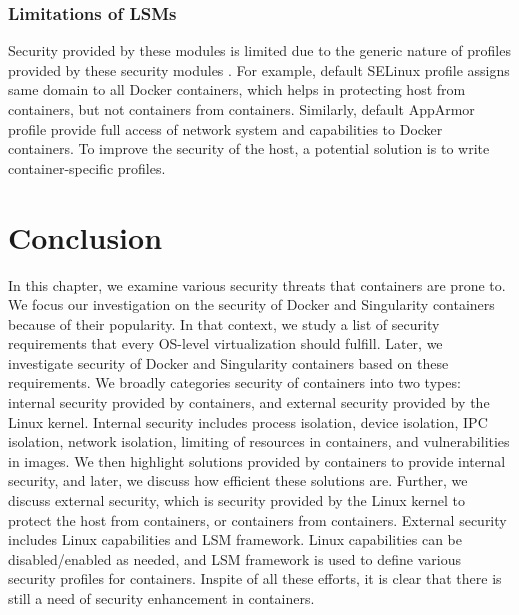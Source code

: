 \subsubsection{Limitations of LSMs}

Security provided by these modules is limited due to
the generic nature of profiles provided by these security
modules \cite{martin2018docker}. For example, default
SELinux profile assigns same domain to all Docker
containers, which helps in protecting host from containers,
but not containers from containers. Similarly, default
AppArmor profile provide full access of network system and
capabilities to Docker containers.
To improve the security of the host, a potential solution is to write
container-specific profiles.
\section{Conclusion}
In this chapter, we examine various security threats that
containers are prone to. We focus our investigation on the
security of Docker and Singularity containers because of their popularity.
In that context, we study a list of security requirements that every OS-level
virtualization should fulfill. Later, we investigate security of Docker and Singularity
containers based on these requirements. We broadly categories security of
containers into two types: internal security provided by containers, and
external security provided by the Linux kernel.
Internal security includes process isolation, device isolation, IPC
isolation, network isolation, limiting of resources in containers, and
vulnerabilities in images.
We then highlight solutions
provided by containers to provide internal security, and later,
we discuss how efficient these solutions are.
Further, we discuss external security, which is security provided by
the Linux kernel to protect the host from containers, or containers from
containers. External security includes Linux
capabilities and LSM framework. Linux capabilities can be
disabled/enabled as needed, and LSM framework is used
to define various security profiles for containers.
Inspite of all these efforts, it is clear that there is
still a need of security enhancement in containers.

